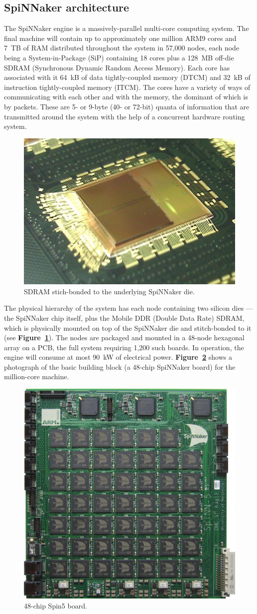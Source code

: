 \documentclass[a4paper, 11pt]{article}
\begin{document}
\subsection{SpiNNaker architecture}

The SpiNNaker engine is a massively-parallel multi-core computing system. The final machine will contain up to approximately one million ARM9 cores and 7~TB of RAM distributed throughout the system in 57,000 nodes, each node being a System-in-Package (SiP) containing 18 cores plus a 128~MB off-die SDRAM (Synchronous Dynamic Random Access Memory). Each core has associated with it 64~kB of data tightly-coupled memory (DTCM) and 32~kB of instruction tightly-coupled memory (ITCM). The cores have a variety of ways of communicating with each other and with the memory, the dominant of which is by packets. These are 5- or 9-byte (40- or 72-bit) quanta of information that are transmitted around the system with the help of a concurrent hardware routing system. 

\begin{figure}[htbp]
	\centering
	\includegraphics[width=0.25\linewidth]{images/spinnaker_die.jpg}
	\caption{SDRAM stich-bonded to the underlying SpiNNaker die.}
	\label{fig:spinnaker_die}
\end{figure}

The physical hierarchy of the system has each node containing two silicon dies --- the SpiNNaker chip itself, plus the Mobile DDR (Double Data Rate) SDRAM, which is physically mounted on top of the SpiNNaker die and stitch-bonded to it (see \textbf{Figure~\ref{fig:spinnaker_die}}). The nodes are packaged and mounted in a 48-node hexagonal array on a PCB, the full system requiring 1,200 such boards. In operation, the engine will consume at most 90~kW of electrical power. \textbf{Figure~\ref{fig:spin5}} shows a photograph of the basic building block (a 48-chip SpiNNaker board) for the million-core machine.

\begin{figure}[htbp]
	\centering
	\includegraphics[width=0.45\linewidth]{images/spin5.jpg}
	\caption{48-chip Spin5 board.}
	\label{fig:spin5}
\end{figure}
\end{document}
